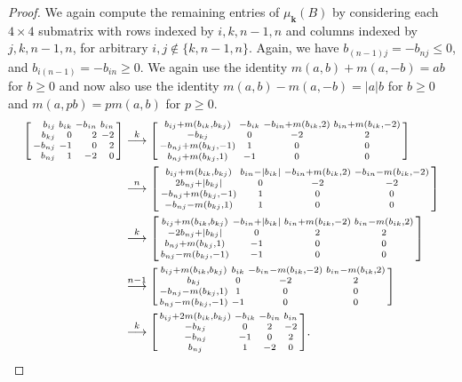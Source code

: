 \documentclass{amsart}
\theoremstyle{definition}
\theoremstyle{remark}
\numberwithin{equation}{section}
\newcommand{\set}[1]{{\lbrace #1 \rbrace}}
\newcommand{\0}{{\mathbf{0}}}
\newcommand{\kk}{\mathbf{k}}
\begin{document}
\begin{proof}
We again compute the remaining entries of $\mu_\kk(B)$ by considering each $4\times4$ submatrix with rows indexed by $i,k,n-1,n$ and columns indexed by $j,k,n-1,n$, for arbitrary $i,j\not\in\set{k,n-1,n}$.
Again, we have $b_{(n-1)j}=-b_{nj}\le0$, and $b_{i(n-1)}=-b_{in}\ge0$.
We again use the identity $m(a,b)+m(a,-b)=ab$ for $b\ge0$ and now also use the identity $m(a,b)-m(a,-b)=|a|b$ for $b\ge0$ and $m(a,pb)=pm(a,b)$ for $p\ge0$.
\begin{align*}
\begin{bsmallmatrix*}[r]
b_{ij}&b_{ik}&-b_{in}&b_{in}\\
b_{kj}&0&2&-2\\
-b_{nj}&-1&0&2\\
b_{nj}&1&-2&0
\end{bsmallmatrix*}
&\overset{k}{\longrightarrow}
\begin{bsmallmatrix*}
b_{ij}+m(b_{ik},b_{kj}) & -b_{ik} & -b_{in}+m(b_{ik},2) & b_{in}+m(b_{ik},-2)\\
-b_{kj} & 0 & -2 & 2\\
-b_{nj}+m(b_{kj},-1) & 1 & 0 & 0\\
b_{nj}+m(b_{kj},1) & -1 & 0 & 0
\end{bsmallmatrix*}\\
&\overset{n}{\longrightarrow}
\begin{bsmallmatrix*}
b_{ij}+m(b_{ik},b_{kj}) & b_{in}-|b_{ik}| & -b_{in}+m(b_{ik},2) & -b_{in}-m(b_{ik},-2)\\
2b_{nj}+|b_{kj}| & 0 & -2 & -2\\
-b_{nj}+m(b_{kj},-1) & 1 & 0 & 0\\
-b_{nj}-m(b_{kj},1) & 1 & 0 & 0
\end{bsmallmatrix*}\\
&\overset{k}{\longrightarrow}
\begin{bsmallmatrix*}
b_{ij}+m(b_{ik},b_{kj}) & -b_{in}+|b_{ik}| & b_{in}+m(b_{ik},-2) & b_{in}-m(b_{ik},2)\\
-2b_{nj}+|b_{kj}| & 0 & 2 & 2\\
b_{nj}+m(b_{kj},1)  & -1 & 0 & 0\\
b_{nj}-m(b_{kj},-1)& -1 & 0 & 0
\end{bsmallmatrix*}\\
&\overset{n-1}{\longrightarrow}
\begin{bsmallmatrix*}
b_{ij}+m(b_{ik},b_{kj}) & b_{ik} & -b_{in}-m(b_{ik},-2) & b_{in}-m(b_{ik},2)\\
b_{kj}& 0 & -2 & 2\\
-b_{nj}-m(b_{kj},1)& 1 & 0 & 0\\
b_{nj}-m(b_{kj},-1) & -1 & 0 & 0
\end{bsmallmatrix*}\\
&\overset{k}{\longrightarrow}
\begin{bsmallmatrix*}
b_{ij}+2m(b_{ik},b_{kj}) & -b_{ik} & -b_{in} & b_{in}\\
-b_{kj} & 0 & 2 & -2\\
-b_{nj} & -1 & 0 & 2\\
b_{nj} & 1 & -2 & 0
\end{bsmallmatrix*}.
\end{align*}


\end{proof}
\end{document}
